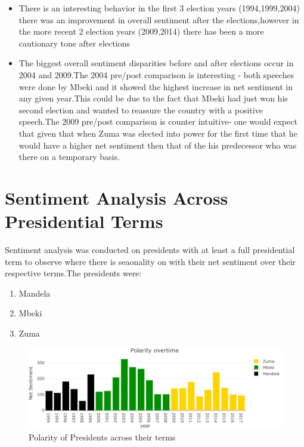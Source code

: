 \documentclass[]{article}
\begin{document}
\begin{itemize}

\item There is an interesting behavior in the first 3 election years (1994,1999,2004) there was an improvement in overall sentiment after the elections,however in the more recent 2 election years (2009,2014) there has been a more cautionary tone after elections  
\item The biggest  overall sentiment disparities before and after elections occur in 2004 and 2009.The 2004 pre/post comparison is interesting - both speeches were done by Mbeki and it showed the highest increase in net sentiment in any given year.This could be due to the fact that Mbeki had just won his second election and wanted to reassure the country with a positive speech.The 2009 pre/post comparison is counter intuitive-  one would expect that given that when Zuma was elected into power for the first time that he would have a higher net sentiment then that of the his predecessor who was there on a temporary basis.

\end{itemize}

\section{Sentiment Analysis Across Presidential Terms}

Sentiment analysis was conducted on presidents with at least a full
presidential term to observe where there is seaonality on with their net
sentiment over their respective terms.The presidents were:

\begin{enumerate}
\item Mandela
\item Mbeki
\item Zuma
\end{enumerate}

\begin{figure}[H]

{\centering \includegraphics{datasci_fi_Assignment_2_files/figure-latex/Mandela_Mbeki_Zuma-1} 

}

\caption{Polarity of Presidents across their terms}\label{fig:Mandela_Mbeki_Zuma}
\end{figure}
\end{document}
